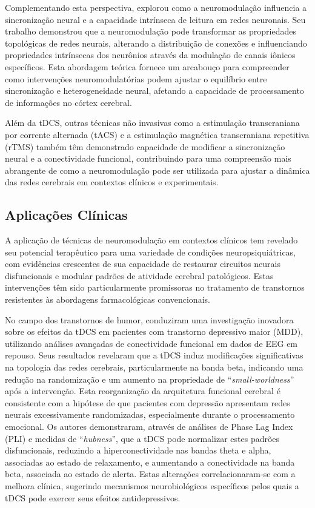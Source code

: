 Complementando esta perspectiva,  explorou como a neuromodulação influencia a sincronização neural e a capacidade intrínseca de leitura em redes neuronais. Seu trabalho demonstrou que a neuromodulação pode transformar as propriedades topológicas de redes neurais, alterando a distribuição de conexões e influenciando propriedades intrínsecas dos neurônios através da modulação de canais iônicos específicos. Esta abordagem teórica fornece um arcabouço para compreender como intervenções neuromodulatórias podem ajustar o equilíbrio entre sincronização e heterogeneidade neural, afetando a capacidade de processamento de informações no córtex cerebral.

Além da tDCS, outras técnicas não invasivas como a estimulação transcraniana por corrente alternada (tACS) e a estimulação magnética transcraniana repetitiva (rTMS) também têm demonstrado capacidade de modificar a sincronização neural e a conectividade funcional, contribuindo para uma compreensão mais abrangente de como a neuromodulação pode ser utilizada para ajustar a dinâmica das redes cerebrais em contextos clínicos e experimentais.

\subsection{Aplicações Clínicas}
A aplicação de técnicas de neuromodulação em contextos clínicos tem revelado seu potencial terapêutico para uma variedade de condições neuropsiquiátricas, com evidências crescentes de sua capacidade de restaurar circuitos neurais disfuncionais e modular padrões de atividade cerebral patológicos. Estas intervenções têm sido particularmente promissoras no tratamento de transtornos resistentes às abordagens farmacológicas convencionais.

No campo dos transtornos de humor,  conduziram uma investigação inovadora sobre os efeitos da tDCS em pacientes com transtorno depressivo maior (MDD), utilizando análises avançadas de conectividade funcional em dados de EEG em repouso. Seus resultados revelaram que a tDCS induz modificações significativas na topologia das redes cerebrais, particularmente na banda beta, indicando uma redução na randomização e um aumento na propriedade de ``\textit{small-worldness}'' após a intervenção. Esta reorganização da arquitetura funcional cerebral é consistente com a hipótese de que pacientes com depressão apresentam redes neurais excessivamente randomizadas, especialmente durante o processamento emocional. Os autores demonstraram, através de análises de Phase Lag Index (PLI) e medidas de ``\textit{hubness}'', que a tDCS pode normalizar estes padrões disfuncionais, reduzindo a hiperconectividade nas bandas theta e alpha, associadas ao estado de relaxamento, e aumentando a conectividade na banda beta, associada ao estado de alerta. Estas alterações correlacionaram-se com a melhora clínica, sugerindo mecanismos neurobiológicos específicos pelos quais a tDCS pode exercer seus efeitos antidepressivos.

